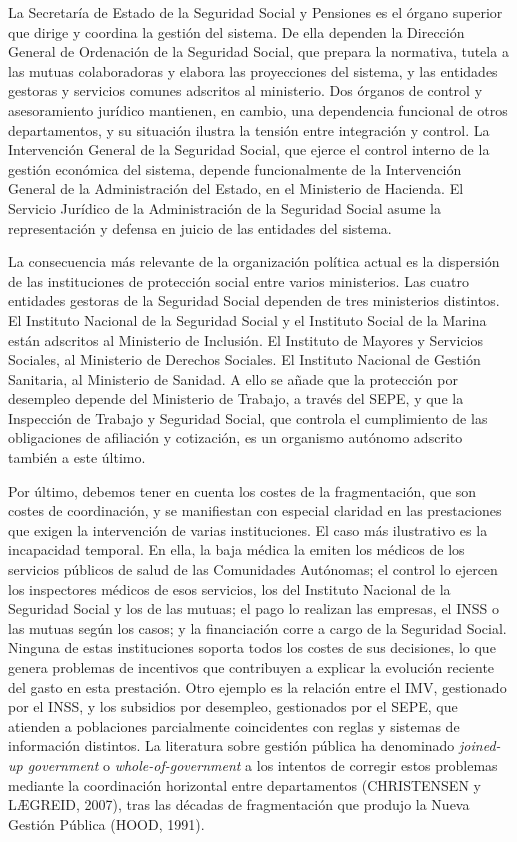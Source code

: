 \documentclass[10pt,a4paper]{article}
\begin{document}
La Secretaría de Estado de la Seguridad Social y Pensiones es el órgano superior que dirige y coordina la gestión del sistema. De ella dependen la Dirección General de Ordenación de la Seguridad Social, que prepara la normativa, tutela a las mutuas colaboradoras y elabora las proyecciones del sistema, y las entidades gestoras y servicios comunes adscritos al ministerio. Dos órganos de control y asesoramiento jurídico mantienen, en cambio, una dependencia funcional de otros departamentos, y su situación ilustra la tensión entre integración y control. La Intervención General de la Seguridad Social, que ejerce el control interno de la gestión económica del sistema, depende funcionalmente de la Intervención General de la Administración del Estado, en el Ministerio de Hacienda. El Servicio Jurídico de la Administración de la Seguridad Social asume la representación y defensa en juicio de las entidades del sistema.

La consecuencia más relevante de la organización política actual es la dispersión de las instituciones de protección social entre varios ministerios. Las cuatro entidades gestoras de la Seguridad Social dependen de tres ministerios distintos. El Instituto Nacional de la Seguridad Social y el Instituto Social de la Marina están adscritos al Ministerio de Inclusión. El Instituto de Mayores y Servicios Sociales, al Ministerio de Derechos Sociales. El Instituto Nacional de Gestión Sanitaria, al Ministerio de Sanidad. A ello se añade que la protección por desempleo depende del Ministerio de Trabajo, a través del SEPE, y que la Inspección de Trabajo y Seguridad Social, que controla el cumplimiento de las obligaciones de afiliación y cotización, es un organismo autónomo adscrito también a este último.

Por último, debemos tener en cuenta los costes de la fragmentación, que son costes de coordinación, y se manifiestan con especial claridad en las prestaciones que exigen la intervención de varias instituciones. El caso más ilustrativo es la incapacidad temporal. En ella, la baja médica la emiten los médicos de los servicios públicos de salud de las Comunidades Autónomas; el control lo ejercen los inspectores médicos de esos servicios, los del Instituto Nacional de la Seguridad Social y los de las mutuas; el pago lo realizan las empresas, el INSS o las mutuas según los casos; y la financiación corre a cargo de la Seguridad Social. Ninguna de estas instituciones soporta todos los costes de sus decisiones, lo que genera problemas de incentivos que contribuyen a explicar la evolución reciente del gasto en esta prestación. Otro ejemplo es la relación entre el IMV, gestionado por el INSS, y los subsidios por desempleo, gestionados por el SEPE, que atienden a poblaciones parcialmente coincidentes con reglas y sistemas de información distintos. La literatura sobre gestión pública ha denominado \textit{joined-up government} o \textit{whole-of-government} a los intentos de corregir estos problemas mediante la coordinación horizontal entre departamentos (CHRISTENSEN y LÆGREID, 2007), tras las décadas de fragmentación que produjo la Nueva Gestión Pública (HOOD, 1991).
\end{document}
